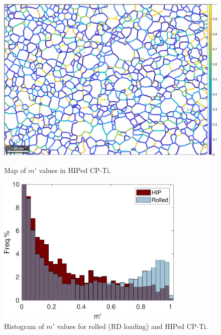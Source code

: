 \begin{figure}[ht]
\centering
  \includegraphics[width=\textwidth]{Figures/mPrimeMap_HIP.png}
  \caption{Map of $m'$ values in HIPed CP-Ti.\label{fig.mPrimeMap}}
  \vspace{\baselineskip}
  \includegraphics[width=0.8\textwidth]{Figures/mPrimeHistogram.pdf}
  \caption{Histogram of $m'$ values for rolled (RD loading) and HIPed CP-Ti.\label{fig.mPrimeHist}}
\end{figure}